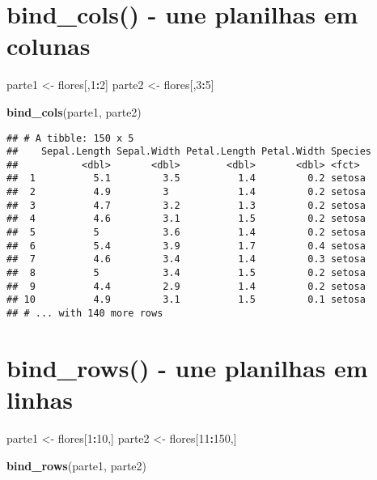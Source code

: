 \documentclass[]{book}
\newenvironment{Shaded}{\begin{snugshade}}{\end{snugshade}}
\newcommand{\DecValTok}[1]{\textcolor[rgb]{0.00,0.00,0.81}{#1}}
\newcommand{\KeywordTok}[1]{\textcolor[rgb]{0.13,0.29,0.53}{\textbf{#1}}}
\newcommand{\NormalTok}[1]{#1}
\newcommand{\OperatorTok}[1]{\textcolor[rgb]{0.81,0.36,0.00}{\textbf{#1}}}
\newcommand{\StringTok}[1]{\textcolor[rgb]{0.31,0.60,0.02}{#1}}
\begin{document}
\hypertarget{bind_cols---une-planilhas-em-colunas}{%
\section{bind\_cols() - une planilhas em colunas}\label{bind_cols---une-planilhas-em-colunas}}

\begin{Shaded}
\begin{Highlighting}[]
\NormalTok{parte1 <-}\StringTok{ }\NormalTok{flores[,}\DecValTok{1}\OperatorTok{:}\DecValTok{2}\NormalTok{]}
\NormalTok{parte2 <-}\StringTok{ }\NormalTok{flores[,}\DecValTok{3}\OperatorTok{:}\DecValTok{5}\NormalTok{]}

\KeywordTok{bind_cols}\NormalTok{(parte1, parte2)}
\end{Highlighting}
\end{Shaded}

\begin{verbatim}
## # A tibble: 150 x 5
##    Sepal.Length Sepal.Width Petal.Length Petal.Width Species
##           <dbl>       <dbl>        <dbl>       <dbl> <fct>  
##  1          5.1         3.5          1.4         0.2 setosa 
##  2          4.9         3            1.4         0.2 setosa 
##  3          4.7         3.2          1.3         0.2 setosa 
##  4          4.6         3.1          1.5         0.2 setosa 
##  5          5           3.6          1.4         0.2 setosa 
##  6          5.4         3.9          1.7         0.4 setosa 
##  7          4.6         3.4          1.4         0.3 setosa 
##  8          5           3.4          1.5         0.2 setosa 
##  9          4.4         2.9          1.4         0.2 setosa 
## 10          4.9         3.1          1.5         0.1 setosa 
## # ... with 140 more rows
\end{verbatim}

\hypertarget{bind_rows---une-planilhas-em-linhas}{%
\section{bind\_rows() - une planilhas em linhas}\label{bind_rows---une-planilhas-em-linhas}}

\begin{Shaded}
\begin{Highlighting}[]
\NormalTok{parte1 <-}\StringTok{ }\NormalTok{flores[}\DecValTok{1}\OperatorTok{:}\DecValTok{10}\NormalTok{,]}
\NormalTok{parte2 <-}\StringTok{ }\NormalTok{flores[}\DecValTok{11}\OperatorTok{:}\DecValTok{150}\NormalTok{,]}

\KeywordTok{bind_rows}\NormalTok{(parte1, parte2)}
\end{Highlighting}
\end{Shaded}
\end{document}
